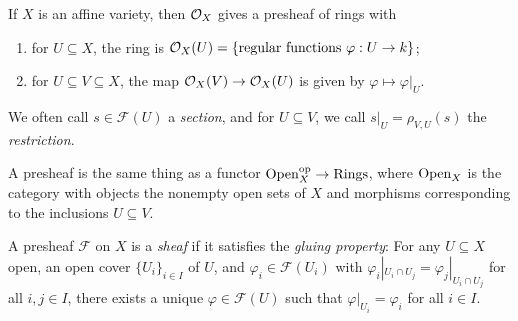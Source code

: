 \begin{example}
  If $X$ is an affine variety, then
  $\mathcal{O}_X$ gives a presheaf of rings with
  \begin{enumerate}
    \item for $U \subseteq X$,
      the ring is
      $\mathcal{O}_X(U) = \{\text{regular functions } \varphi : U \to k\}$;
    \item for $U \subseteq V \subseteq X$,
      the map
      $\mathcal{O}_X(V) \to \mathcal{O}_X(U)$
      is given by
      $\varphi \mapsto \varphi|_U$.
  \end{enumerate}
\end{example}

\begin{remark}
  We often call $s \in \mathcal{F}(U)$
  a \emph{section}, and for
  $U \subseteq V$, we call
  $s|_U = \rho_{V, U}(s)$
  the \emph{restriction}.
\end{remark}

\begin{remark}
  A presheaf is the same thing as a functor
  $\operatorname{Open}_X^{\mathrm{op}} \to \operatorname{Rings}$,
  where $\operatorname{Open}_X$ is the category with
  objects the nonempty open sets
  of $X$ and morphisms corresponding
  to the inclusions $U \subseteq V$.
\end{remark}

\begin{definition}
  A presheaf $\mathcal{F}$ on $X$ is a
  \emph{sheaf} if it satisfies
  the \emph{gluing property}: For
  any $U \subseteq X$ open,
  an open cover $\{U_i\}_{i \in I}$ of $U$, and
  $\varphi_i \in \mathcal{F}(U_i)$
  with $\varphi_i|_{U_i \cap U_j} = \varphi_j|_{U_i \cap U_j}$
  for all $i, j \in I$,
  there exists a unique
  $\varphi \in \mathcal{F}(U)$
  such that $\varphi|_{U_i} = \varphi_i$
  for all $i \in I$.
\end{definition}

